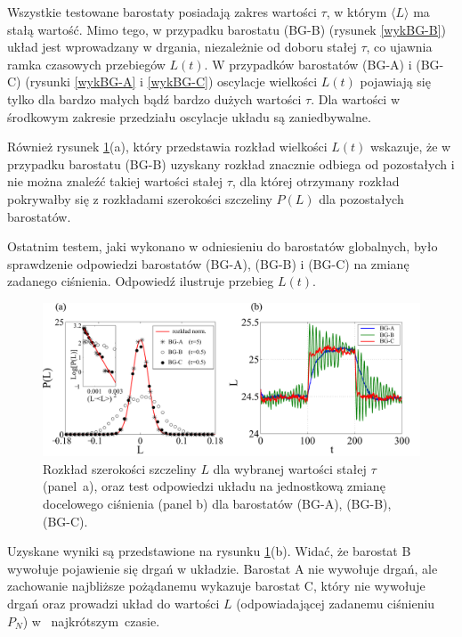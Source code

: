 \documentclass[12pt,a4paper,openright]{report} %
\begin{document}
Wszystkie testowane barostaty posiadają zakres wartości $\tau$, w którym $\langle L \rangle$ ma stałą wartość. Mimo tego, w przypadku barostatu (BG-B) (rysunek \ref{wykBG-B}) układ jest wprowadzany w drgania, niezależnie od doboru stałej $\tau$, co ujawnia ramka czasowych przebiegów $L(t)$. W przypadków barostatów (BG-A) i (BG-C) (rysunki \ref{wykBG-A} i \ref{wykBG-C}) oscylacje wielkości $L(t)$ pojawiają się tylko dla bardzo małych bądź bardzo dużych wartości $\tau$. Dla wartości w środkowym zakresie przedziału oscylacje układu są zaniedbywalne.   

Również rysunek \ref{BG-rozklad-skok}(a), który przedstawia rozkład wielkości $L(t)$ wskazuje, \linebreak że w przypadku barostatu (BG-B) uzyskany rozkład znacznie odbiega od pozostałych i nie można znaleźć takiej wartości stałej $\tau$, dla której otrzymany rozkład pokrywałby się z rozkładami szerokości szczeliny $P(L)$ dla pozostałych barostatów. 

%
%
Ostatnim testem, jaki wykonano w odniesieniu do barostatów globalnych, było sprawdzenie odpowiedzi barostatów (BG-A), (BG-B) i (BG-C) na zmianę zadanego ciśnienia. Odpowiedź ilustruje przebieg $L(t)$.
%
\begin{figure}[h]
\centering
\includegraphics[width=160mm]{rysunki/BG-rozklad-skok.pdf}
\caption{Rozkład szerokości szczeliny $L$ dla wybranej wartości stałej $\tau$ (panel~a), oraz test odpowiedzi układu na jednostkową zmianę docelowego ciśnienia (panel b) dla barostatów (BG-A), (BG-B), (BG-C).}
\label{BG-rozklad-skok}
\end{figure}
%
Uzyskane wyniki są przedstawione na rysunku \ref{BG-rozklad-skok}(b). Widać, że barostat B wywołuje pojawienie się drgań w układzie. Barostat A nie wywołuje drgań, ale zachowanie najbliższe pożądanemu wykazuje barostat C, który nie wywołuje drgań oraz prowadzi układ do wartości $L$ (odpowiadającej zadanemu ciśnieniu~$P_N$) w~ najkrótszym~czasie. 
%
%
% 
\end{document}
